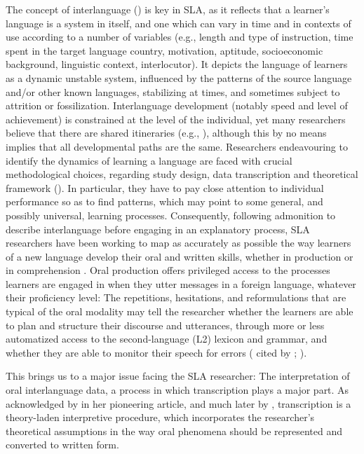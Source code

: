 \documentclass[output=paper,colorlinks,citecolor=brown,modfonts,nonflat]{../langscibook}
\begin{document}
The concept of interlanguage (\citealt{Selinker1972,HanTarone2014,Pallotti2017}) is key in SLA, as it reflects that a learner’s language is a system in itself, and one which can vary in time and in contexts of use according to a number of variables (e.g., length and type of instruction, time spent in the target language country, motivation, aptitude, socioeconomic background, linguistic context, interlocutor). It depicts the language of learners as a dynamic unstable system, influenced by the patterns of the source language and/or other known languages, stabilizing at times, and sometimes subject to attrition or fossilization. Interlanguage development (notably speed and level of achievement) is constrained at the level of the individual, yet many researchers believe that there are shared itineraries (e.g., \citealt{BartningSchlyter2004}), although this by no means implies that all developmental paths are the same. Researchers endeavouring to identify the dynamics of learning a language are faced with crucial methodological choices, regarding study design, data transcription and theoretical framework (\citealt{MackeyGass2012,Revesz2012}). In particular, they have to pay close attention to individual performance so as to find patterns, which may point to some general, and possibly universal, learning processes. Consequently, following  admonition to describe interlanguage before engaging in an explanatory process, SLA researchers have been working to map as accurately as possible the way learners of a new language develop their oral and written skills, whether in production or in comprehension \citep{Ortega2014trying}. Oral production offers privileged access to the processes learners are engaged in when they utter messages in a foreign language, whatever their proficiency level: The repetitions, hesitations, and reformulations that are typical of the oral modality may tell the researcher whether the learners are able to plan and structure their discourse and utterances, through more or less automatized access to the second-language (L2) lexicon and grammar, and whether they are able to monitor their speech for errors (\citealt[47]{Segalowitz2010} cited by \citealt[29]{Hilton2014}; \citealt{Kormos2006}).

\newpage
This brings us to a major issue facing the SLA researcher: The interpretation of oral interlanguage data, a process in which transcription plays a major part. As acknowledged by \citet{Ochs1979} in her pioneering article, and much later by \citet{Mondada2000, Mondada2002, Mondada2007}, transcription is a theory-laden interpretive procedure, which incorporates the researcher’s theoretical assumptions in the way oral phenomena should be represented and converted to written form. 
\end{document}
